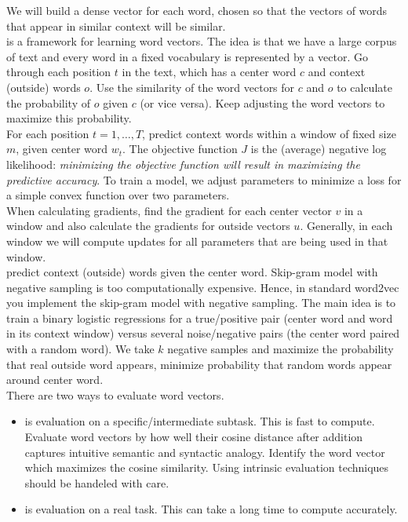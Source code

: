 \documentclass{article}
\begin{document}
We will build a dense vector for each word, chosen so that the vectors of words that appear in similar context will be similar. \\ 

 is a framework for learning word vectors. The idea is that we have a large corpus of text and every word in a fixed vocabulary is represented by a vector. Go through each position $t$ in the text, which has a center word $c$ and context (outside) words $o$. Use the similarity of the word vectors for $c$ and $o$ to calculate the probability of $o$ given $c$ (or vice versa). Keep adjusting the word vectors to maximize this probability. \\ 

For each position $t=1, \dots , T$, predict context words within a window of fixed size $m$, given center word $w_t$. The objective function $J$ is the (average) negative log likelihood: \emph{minimizing the objective function will result in maximizing the predictive accuracy}. To train a model, we adjust parameters to minimize a loss for a simple convex function over two parameters. \\ 

When calculating gradients, find the gradient for each center vector $v$ in a window and also calculate the gradients for outside vectors $u$. Generally, in each window we will compute updates for all parameters that are being used in that window. \\ 

 predict context (outside) words given the center word. Skip-gram model with negative sampling is too computationally expensive. Hence, in standard word2vec you implement the skip-gram model with negative sampling. The main idea is to train a binary logistic regressions for a true/positive pair (center word and word in its context window) versus several noise/negative pairs (the center word paired with a random word). We take $k$ negative samples and maximize the probability that real outside word appears, minimize probability that random words appear around center word. \\ 

There are two ways to evaluate word vectors. 
\begin{itemize} 
  \item {} is evaluation on a specific/intermediate subtask. This is fast to compute. Evaluate word vectors by how well their cosine distance after addition captures intuitive semantic and syntactic analogy. Identify the word vector which maximizes the cosine similarity. Using intrinsic evaluation techniques should be handeled with care. 
  \item {} is evaluation on a real task. This can take a long time to compute accurately.
\end{itemize}
\end{document}
